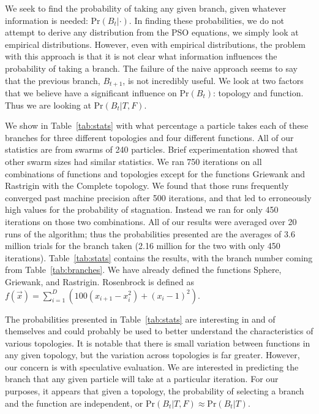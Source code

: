 \documentclass[journal,letterpaper]{IEEEtran}
\providecommand{\prob}{\ensuremath{\mathrm{Pr}}}
\begin{document}
We seek to find the probability of taking any given branch, given whatever
information is needed: $\prob(B_t|\cdot)$.  In finding these probabilities, we
do not attempt to derive any distribution from the PSO equations, we simply
look at empirical distributions.  However, even with empirical distributions,
the problem with this approach is that it is not clear what information
influences the probability of taking a branch.  The failure of the naive
approach seems to say that the previous branch, $B_{t+1}$, is not incredibly
useful.  We look at two factors that we believe have a significant influence on
$\prob(B_t)$: topology and function.  Thus we are looking at $\prob(B_t|T,F)$.

We show in Table~\ref{tab:stats} with what percentage a particle takes each of
these branches for three different topologies and four different functions.
All of our statistics are from swarms of 240 particles.  Brief experimentation
showed that other swarm sizes had similar statistics.  We ran 750 iterations on
all combinations of functions and topologies except for the functions Griewank
and Rastrigin with the Complete topology.  We found that those runs frequently
converged past machine precision after 500 iterations, and that led to
erroneously high values for the probability of stagnation.  Instead we ran for
only 450 iterations on those two combinations.  All of our results were
averaged over 20 runs of the algorithm; thus the probabilities presented are
the averages of 3.6 million trials for the branch taken (2.16 million for the
two with only 450 iterations).  Table~\ref{tab:stats} contains the results,
with the branch number coming from Table~\ref{tab:branches}.  We have already
defined the functions Sphere, Griewank, and Rastrigin.  Rosenbrock is defined
as $f(\Vec{x}) = \sum_{i=1}^D \left(100(x_{i+1}-x_i^2)+(x_i-1)^2\right)$.

The probabilities presented in Table~\ref{tab:stats} are interesting in and of
themselves and could probably be used to better understand the characteristics
of various topologies.  It is notable that there is small variation between
functions in any given topology, but the variation across topologies is far
greater.  However, our concern is with speculative evaluation.  We are
interested in predicting the branch that any given particle will take at a
particular iteration.  For our purposes, it appears that given a topology, the
probability of selecting a branch and the function are independent, or
$\prob(B_t|T,F) \approx \prob(B_t|T)$.
\end{document}

